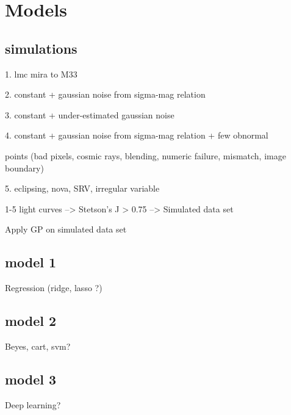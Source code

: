 \section{Models} \label{sec.models}

\subsection{simulations}
1. lmc mira to M33

2. constant + gaussian noise from sigma-mag relation

3. constant + under-estimated gaussian noise 

4. constant + gaussian noise from sigma-mag relation + few obnormal

points (bad pixels, cosmic rays, blending, numeric failure, mismatch,
image boundary)

5. eclipsing, nova, SRV, irregular variable


1-5 light curves --> Stetson's J > 0.75 --> Simulated data set

Apply GP on simulated data set

\subsection{model 1}
Regression (ridge, lasso ?)

\subsection{model 2}
Beyes, cart, svm?

\subsection{model 3}
Deep learning?
